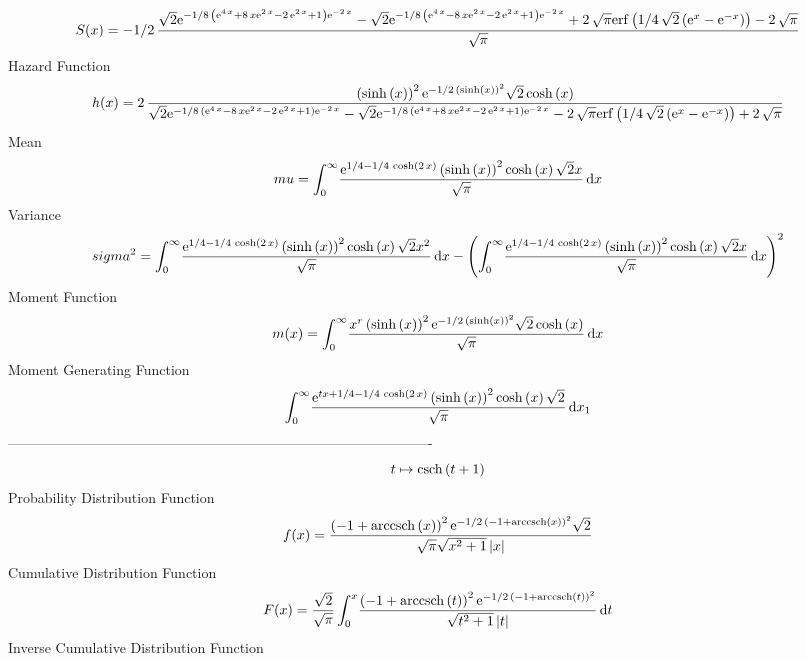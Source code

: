 \documentclass[12pt]{article}
\begin{document}
 $$ S(x)=-1/2\,{\frac {\sqrt {2}{{\rm e}^{-1/8\, \left( {{\rm e}^{4\,x}}+8\,x{
{\rm e}^{2\,x}}-2\,{{\rm e}^{2\,x}}+1 \right) {{\rm e}^{-2\,x}}}}-
\sqrt {2}{{\rm e}^{-1/8\, \left( {{\rm e}^{4\,x}}-8\,x{{\rm e}^{2\,x}}
-2\,{{\rm e}^{2\,x}}+1 \right) {{\rm e}^{-2\,x}}}}+2\,\sqrt {\pi}
{\rm erf} \left(1/4\,\sqrt {2} \left( {{\rm e}^{x}}-{{\rm e}^{-x}}
 \right) \right)-2\,\sqrt {\pi}}{\sqrt {\pi}}}
$$ Hazard Function 
 $$ h(x)=2\,{\frac { \left( \sinh \left( x \right)  \right) ^{2}{{\rm e}^{-1/2
\, \left( \sinh \left( x \right)  \right) ^{2}}}\sqrt {2}\cosh \left( 
x \right) }{\sqrt {2}{{\rm e}^{-1/8\, \left( {{\rm e}^{4\,x}}-8\,x{
{\rm e}^{2\,x}}-2\,{{\rm e}^{2\,x}}+1 \right) {{\rm e}^{-2\,x}}}}-
\sqrt {2}{{\rm e}^{-1/8\, \left( {{\rm e}^{4\,x}}+8\,x{{\rm e}^{2\,x}}
-2\,{{\rm e}^{2\,x}}+1 \right) {{\rm e}^{-2\,x}}}}-2\,\sqrt {\pi}
{\rm erf} \left(1/4\,\sqrt {2} \left( {{\rm e}^{x}}-{{\rm e}^{-x}}
 \right) \right)+2\,\sqrt {\pi}}}
$$Mean 
 $$ mu=\int_{0}^{\infty }\!{\frac {{{\rm e}^{1/4-1/4\,\cosh \left( 2\,x
 \right) }} \left( \sinh \left( x \right)  \right) ^{2}\cosh \left( x
 \right) \sqrt {2}x}{\sqrt {\pi}}}\,{\rm d}x
$$ Variance 
 $$ sigma^2 = \int_{0}^{\infty }\!{\frac {{{\rm e}^{1/4-1/4\,\cosh \left( 2\,x
 \right) }} \left( \sinh \left( x \right)  \right) ^{2}\cosh \left( x
 \right) \sqrt {2}{x}^{2}}{\sqrt {\pi}}}\,{\rm d}x- \left( \int_{0}^{
\infty }\!{\frac {{{\rm e}^{1/4-1/4\,\cosh \left( 2\,x \right) }}
 \left( \sinh \left( x \right)  \right) ^{2}\cosh \left( x \right) 
\sqrt {2}x}{\sqrt {\pi}}}\,{\rm d}x \right) ^{2}
$$Moment Function 
 $$ m(x) = \int_{0}^{\infty }\!{\frac {{x}^{r} \left( \sinh \left( x \right) 
 \right) ^{2}{{\rm e}^{-1/2\, \left( \sinh \left( x \right)  \right) ^
{2}}}\sqrt {2}\cosh \left( x \right) }{\sqrt {\pi}}}\,{\rm d}x
$$ Moment Generating Function 
 $$\int_{0}^{\infty }\!{\frac {{{\rm e}^{tx+1/4-1/4\,\cosh \left( 2\,x
 \right) }} \left( \sinh \left( x \right)  \right) ^{2}\cosh \left( x
 \right) \sqrt {2}}{\sqrt {\pi}}}\,{\rm d}x_{{1}}
$$-------------------------------------------------------------------------------------------  \\$$t\mapsto {\rm csch} \left(t+1\right)
$$Probability Distribution Function 
$$  f(x)={\frac { \left( -1+{\rm arccsch} \left(x\right) \right) ^{2}{{\rm e}^{
-1/2\, \left( -1+{\rm arccsch} \left(x\right) \right) ^{2}}}\sqrt {2}
}{\sqrt {\pi}\sqrt {{x}^{2}+1} \left| x \right| }}
$$Cumulative Distribution Function  
 $$F(x)={\frac {\sqrt {2}}{\sqrt {\pi}}\int_{0}^{x}\!{\frac { \left( -1+
{\rm arccsch} \left(t\right) \right) ^{2}{{\rm e}^{-1/2\, \left( -1+
{\rm arccsch} \left(t\right) \right) ^{2}}}}{\sqrt {{t}^{2}+1} \left| 
t \right| }}\,{\rm d}t}
$$ Inverse Cumulative Distribution Function 
\end{document}

